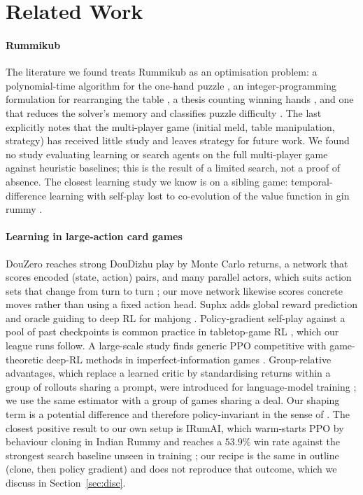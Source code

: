 \documentclass[10pt,journal,compsoc]{IEEEtran}
\begin{document}
\section{Related Work}
\paragraph*{Rummikub}
The literature we found treats Rummikub as an optimisation problem: a polynomial-time algorithm for the one-hand puzzle \cite{vanrijn2016}, an integer-programming formulation for rearranging the table \cite{denhertog2006}, a thesis counting winning hands \cite{feijen2023}, and one that reduces the solver's memory and classifies puzzle difficulty \cite{wekken2025}. The last explicitly notes that the multi-player game (initial meld, table manipulation, strategy) has received little study and leaves strategy for future work. We found no study evaluating learning or search agents on the full multi-player game against heuristic baselines; this is the result of a limited search, not a proof of absence. The closest learning study we know is on a sibling game: temporal-difference learning with self-play lost to co-evolution of the value function in gin rummy \cite{kotnik2003}.

\paragraph*{Learning in large-action card games}
DouZero reaches strong DouDizhu play by Monte Carlo returns, a network that scores encoded (state, action) pairs, and many parallel actors, which suits action sets that change from turn to turn \cite{zha2021}; our move network likewise scores concrete moves rather than using a fixed action head. Suphx adds global reward prediction and oracle guiding to deep RL for mahjong \cite{li2020}. Policy-gradient self-play against a pool of past checkpoints is common practice in tabletop-game RL \cite{balla2024}, which our league runs follow. A large-scale study finds generic PPO \cite{schulman2017} competitive with game-theoretic deep-RL methods in imperfect-information games \cite{rudolph2025}. Group-relative advantages, which replace a learned critic by standardising returns within a group of rollouts sharing a prompt, were introduced for language-model training \cite{shao2024}; we use the same estimator with a group of games sharing a deal. Our shaping term is a potential difference and therefore policy-invariant in the sense of \cite{ng1999}. The closest positive result to our own setup is IRumAI, which warm-starts PPO by behaviour cloning in Indian Rummy and reaches a $53.9\%$ win rate against the strongest search baseline unseen in training \cite{mohan2026}; our recipe is the same in outline (clone, then policy gradient) and does not reproduce that outcome, which we discuss in Section~\ref{sec:disc}.
\end{document}
